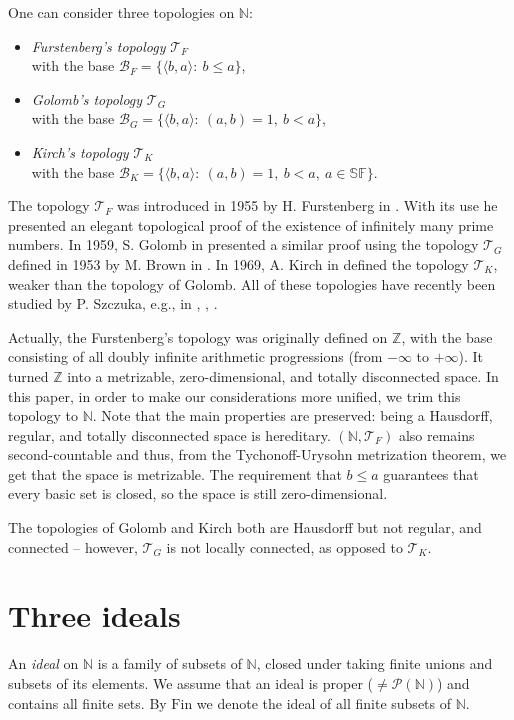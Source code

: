 \documentclass{amsart}
\theoremstyle{definition}
\newcommand{\N}{{\mathbb N}}
\newcommand{\Z}{{\mathbb Z}}
\newcommand{\Fin}{\textrm{Fin}}
\newcommand{\T}{\mathcal{T}}
\newcommand{\B}{\mathcal{B}}
\newcommand{\SqrFr}{\mathbb{SF}}
\newcommand{\arithseq}[2]{\langle#2, #1\rangle}
\begin{document}
One can consider three topologies on $\N$:
\begin{itemize}
\item \emph{Furstenberg's topology} $\T_F$ \\
			with the base $\B_F = \{\arithseq{a}{b} :\ b\leq a\}$,
\item \emph{Golomb's topology} $\T_G$ \\
			with the base $\B_G = \{\arithseq{a}{b} :\ (a,b)=1,\ b<a\}$,
\item \emph{Kirch's topology} $\T_K$ \\
			with the base $\B_K = \{\arithseq{a}{b} :\ (a,b)=1,\ b<a,\ a\in\SqrFr\}$.
\end{itemize}

The topology $\T_F$ was introduced in 1955 by H. Furstenberg in \cite{F}. With its use he presented an elegant topological proof of the existence of infinitely many prime numbers. In 1959, S. Golomb in \cite{G} presented a similar proof using the topology $\T_G$ defined in 1953 by M. Brown in \cite{B}. In 1969, A. Kirch in \cite{K} defined the topology $\T_K$, weaker than the topology of Golomb. All of these topologies have recently been studied by P. Szczuka, e.g., in \cite{Szczuka1}, \cite{Szczuka2}, \cite{Szczuka3}.

Actually, the Furstenberg's topology was originally defined on $\Z$, with the base consisting of all doubly infinite arithmetic progressions (from $-\infty$ to $+\infty$). It turned $\Z$ into a metrizable, zero-dimensional, and totally disconnected space. In this paper, in order to make our considerations more unified, we trim this topology to $\N$. Note that the main properties are preserved: being a Hausdorff, regular, and totally disconnected space is hereditary. $(\N,\T_F)$ also remains second-countable and thus, from the Tychonoff-Urysohn metrization theorem, we get that the space is metrizable. The requirement that $b\leq a$ guarantees that every basic set is closed, so the space is still zero-dimensional.

The topologies of Golomb and Kirch both are Hausdorff but not regular, and connected -- however, $\T_G$ is not locally connected, as opposed to $\T_K$.


\section*{Three ideals}

An \emph{ideal} on $\N$ is a family of subsets of $\N$, closed under taking finite unions and subsets of its elements. We assume that an ideal is proper ($\neq \mathcal{P}(\N)$) and contains all finite sets. By $\Fin$ we denote the ideal of all finite subsets of $\N$.
\end{document}
